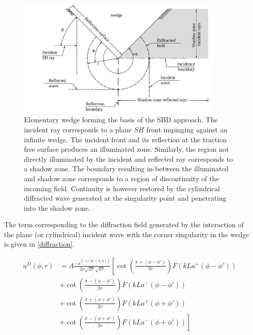 \documentclass[11pt,letterpaper]{article}
\begin{document}
\begin{figure}[H]
\centering
\includegraphics[width=10cm]{IMAGES/figure2.pdf}
\caption{Elementary wedge forming the basis of the SBD approach. The incident ray corresponds to a plane $SH$ front impinging against an infinite wedge. The incident front and its reflection at the traction free surface produces an illuminated zone. Similarly, the region not directly illuminated by the incident and reflected ray corresponds to a shadow zone. The boundary resulting in-between the illuminated and shadow zone corresponds to a region of discontinuity of the incoming field. Continuity is however restored by the cylindrical diffracted wave generated at the singularity point and penetrating into the shadow zone.
\label{fig:fun_wedge}}
%
\end{figure}

The term corresponding to the diffraction field generated by the interaction of the plane (or cylindrical) incident wave with the corner singularity in the wedge is given in \cref{diffraction}. 

\begin{align} \label{diffraction}
u^{D}\left(\phi,r\right)&=A\frac{-e^{\left(-\hat{i}\left(kr+\pi/4\right)\right)}}{2\nu\sqrt{2\pi}\sqrt{kr}}\left[\cot\left(\frac{\pi+\left(\phi-\phi'\right)}{2\nu}\right)F\left(kLa^{+}\left(\phi-\phi'\right)\right)\right.\nonumber\\
&\left.+\cot\left(\frac{\pi-\left(\phi-\phi'\right)}{2\nu}\right)F\left(kLa^{-}\left(\phi-\phi'\right)\right)\right.\nonumber\\
&\left.+\cot\left(\frac{\pi+\left(\phi+\phi'\right)}{2\nu}\right)F\left(kLa^{+}\left(\phi+\phi'\right)\right)\right.\nonumber\\
&\left.+\cot\left(\frac{\pi-\left(\phi+\phi'\right)}{2\nu}\right)F\left(kLa^{-}\left(\phi+\phi'\right)\right) \right]
\end{align}
\end{document}
